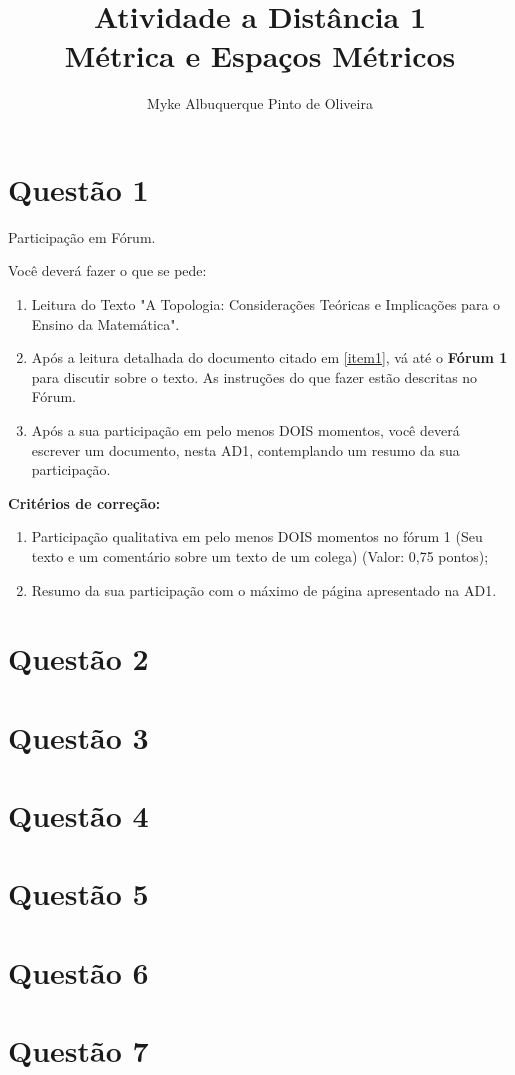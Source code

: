 \documentclass[10pt,a4paper]{article}
\author{Myke Albuquerque Pinto de Oliveira}
\title{\Huge Atividade a Distância 1 \\ 
	Métrica e Espaços Métricos}
\begin{document}
	
	\maketitle
	\newpage
	
	\section*{Questão 1}
	
	Participação em Fórum.
	
	Você deverá fazer o que se pede:
	
	\begin{enumerate}
		\item \label{item1}Leitura do Texto "A Topologia: Considerações Teóricas e Implicações para o Ensino da Matemática".
		\item Após a leitura detalhada do documento citado em \ref{item1}, vá até o \textbf{Fórum 1} para discutir sobre o texto. As instruções do que fazer estão descritas no Fórum.
		\item Após a sua participação em pelo menos DOIS momentos, você deverá escrever um documento, nesta AD1, contemplando um resumo da sua participação.
	\end{enumerate}

	\textbf{Critérios de correção:}
	
	\begin{enumerate}[a]
		\item Participação qualitativa em pelo menos DOIS momentos no fórum 1 (Seu texto e um comentário sobre um texto de um colega) (Valor: 0,75 pontos);
		\item Resumo da sua participação com o máximo de  página apresentado na AD1.
	\end{enumerate}
	
	\section*{Questão 2}
	
	\section*{Questão 3}
	
	\section*{Questão 4}
	
	\section*{Questão 5}
	
	\section*{Questão 6}
	
	\section*{Questão 7}
	
	
\end{document}
